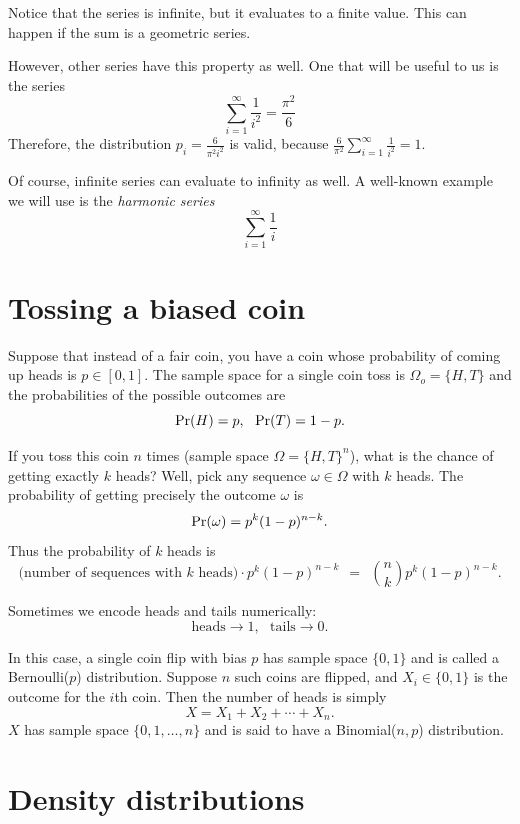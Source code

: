 Notice that the series is infinite, but it evaluates to a finite value. 
This can happen if the sum is a geometric series. 

However, other series have this property as well. 
One that will be useful to us is the series
$$ \sum_{i=1}^\infty \frac{1}{i^2} = \frac{\pi^2}{6} $$
Therefore, the distribution $p_i = \frac{6}{\pi^2 i^2}$ is valid, because $ \frac{6}{\pi^2} \sum_{i=1}^\infty \frac{1}{i^2} = 1 $.

Of course, infinite series can evaluate to infinity as well. 
A well-known example we will use is the \emph{harmonic series}
$$ \sum_{i=1}^\infty \frac{1}{i} $$

\section{Tossing a biased coin}
\label{sec:BaisedCoin}

Suppose that instead of a fair coin, you have a coin whose probability of coming up heads is $p \in [0,1]$. The sample space for a single coin toss is $\Omega_o = \{H,T\}$ and the probabilities of the possible outcomes are
$$ \mbox{\rm Pr}(H) = p, \ \ \mbox{\rm Pr}(T) = 1-p.$$

If you toss this coin $n$ times (sample space $\Omega = \{H,T\}^n$), what is the chance of getting exactly $k$ heads? Well, pick any sequence $\omega \in \Omega$ with $k$ heads. The probability of getting precisely the outcome $\omega$ is
$$ \mbox{\rm Pr}(\omega) = p^k (1-p)^{n-k} .$$
Thus the probability of $k$ heads is
$$ \mbox{(number of sequences with $k$ heads)} \cdot p^k (1-p)^{n-k} 
\ \ = \ \ 
{n \choose k} p^k (1-p)^{n-k} .$$

Sometimes we encode heads and tails numerically:
$$ \mbox{heads} \rightarrow 1, \ \ \ \mbox{tails} \rightarrow 0 .$$

In this case, a single coin flip with bias $p$ has sample space $\{0,1\}$ and is called a Bernoulli($p$) distribution. Suppose $n$ such coins are flipped, and $X_i \in \{0,1\}$ is the outcome for the $i$th coin. Then the number of heads is simply 
$$ X = X_1 + X_2 + \cdots + X_n. $$
$X$ has sample space $\{0,1,\ldots,n\}$ and is said to have a Binomial($n,p$) distribution.


\section{Density distributions}

